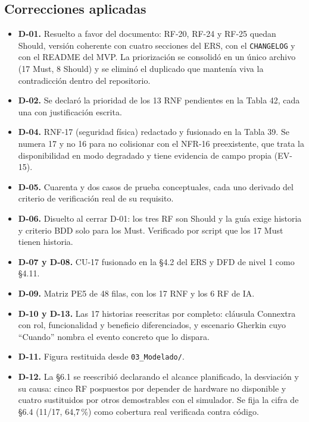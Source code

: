 \subsection{Correcciones aplicadas}

\begin{itemize}
\item \textbf{D-01.} Resuelto a favor del documento: RF-20, RF-24 y RF-25 quedan Should, versi\'on coherente con cuatro secciones del ERS, con el \texttt{CHANGELOG} y con el README del MVP. La priorizaci\'on se consolid\'o en un \'unico archivo (17 Must, 8 Should) y se elimin\'o el duplicado que manten\'ia viva la contradicci\'on dentro del repositorio.
\item \textbf{D-02.} Se declar\'o la prioridad de los 13 RNF pendientes en la Tabla 42, cada una con justificaci\'on escrita.
\item \textbf{D-04.} RNF-17 (seguridad f\'isica) redactado y fusionado en la Tabla 39. Se numera 17 y no 16 para no colisionar con el NFR-16 preexistente, que trata la disponibilidad en modo degradado y tiene evidencia de campo propia (EV-15).
\item \textbf{D-05.} Cuarenta y dos casos de prueba conceptuales, cada uno derivado del criterio de verificaci\'on real de su requisito.
\item \textbf{D-06.} Disuelto al cerrar D-01: los tres RF son Should y la gu\'ia exige historia y criterio BDD solo para los Must. Verificado por script que los 17 Must tienen historia.
\item \textbf{D-07 y D-08.} CU-17 fusionado en la \S4.2 del ERS y DFD de nivel 1 como \S4.11.
\item \textbf{D-09.} Matriz PE5 de 48 filas, con los 17 RNF y los 6 RF de IA.
\item \textbf{D-10 y D-13.} Las 17 historias reescritas por completo: cl\'ausula Connextra con rol, funcionalidad y beneficio diferenciados, y escenario Gherkin cuyo ``Cuando'' nombra el evento concreto que lo dispara.
\item \textbf{D-11.} Figura restituida desde \texttt{03\_Modelado/}.
\item \textbf{D-12.} La \S6.1 se reescribi\'o declarando el alcance planificado, la desviaci\'on y su causa: cinco RF pospuestos por depender de hardware no disponible y cuatro sustituidos por otros demostrables con el simulador. Se fija la cifra de \S6.4 (11/17, 64,7\,\%) como cobertura real verificada contra c\'odigo.
\end{itemize}

